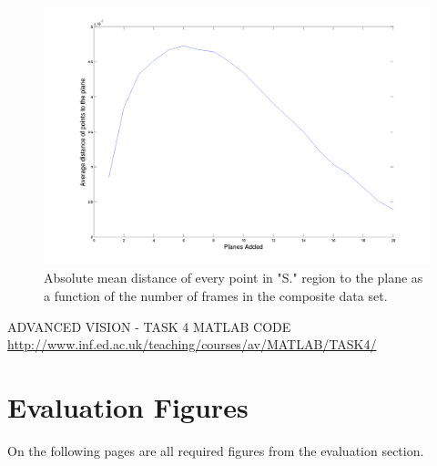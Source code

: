 \documentclass[12pt,a4paper,onecolumn]{article}
\begin{document}
\begin{figure}[h]
  \centering
  \includegraphics[width=1\textwidth]{figs/plane_angle_error_versus_foundation_plane}
  \caption{Absolute mean distance of every point in "S." region to the plane as a function of the number of frames in the composite data set.}
  \label{fig:plane_angle_error_versus_foundation_plane}
\end{figure}

\begin{thebibliography}{9}
  
  ADVANCED VISION - TASK 4 MATLAB CODE
  \url{http://www.inf.ed.ac.uk/teaching/courses/av/MATLAB/TASK4/} 
  
\end{thebibliography}

\appendix

\section{Evaluation Figures}
On the following pages are all required figures from the evaluation section.
\end{document}
